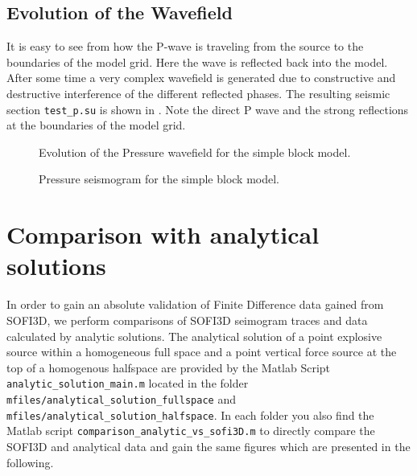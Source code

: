 \documentclass[11pt,onecolumn,oneside]{article}
\begin{document}
\subsection{Evolution of the Wavefield}
It is easy to see from  how the P-wave is traveling from the source to the boundaries of the model grid. Here the wave is 
reflected back into the model. After some time a very complex wavefield is generated due to constructive and destructive interference of the different
reflected phases. The resulting seismic section  \lstinline{test_p.su} is shown in . Note the direct P wave and the strong 
reflections at the boundaries of the model grid.
\begin{figure}[ht]
\begin{center}
\caption{\label{test_1_hom_snap.pdf} Evolution of the Pressure wavefield for the simple block model.}
\end{center}
\end{figure}
\clearpage
\begin{figure}[ht]
\begin{center}
\caption{\label{seis_hom_test_2.ps} Pressure seismogram for the simple block model.}
\end{center}
\end{figure} 
\clearpage

\section{Comparison with analytical solutions}
\label{analytic}

In order to gain an absolute validation of Finite Difference data gained from SOFI3D, we perform comparisons of SOFI3D seimogram traces and data calculated by analytic solutions. The analytical solution of a point explosive source within a homogeneous full space and a point vertical force source at the top of a homogenous halfspace are provided by the Matlab Script  \lstinline{analytic_solution_main.m} located in the folder  \lstinline{mfiles/analytical_solution_fullspace} and  \lstinline{mfiles/analytical_solution_halfspace}. In each folder you also find the Matlab script  \lstinline{comparison_analytic_vs_sofi3D.m} to directly compare the SOFI3D and analytical data and gain the same figures which are presented in the following.
\end{document}
